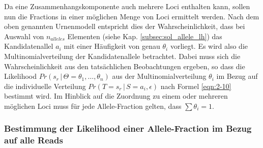 Da eine Zusammenhangskomponente auch mehrere Loci enthalten kann, sollen nun die Fractions in einer möglichen Menge von Loci ermittelt werden. Nach dem oben genannten Urnenmodell entspricht dies der Wahrscheinlichkeit, dass bei Auswahl von $n_{alleles}$ Elementen (siehe Kap. \ref{subsec:sol_allele_lh}) das Kandidatenallel $ a_{i}$ mit einer Häufigkeit von genau $\theta_{i}$ vorliegt. Es wird also die Multinomialverteilung der Kandidatenallele betrachtet. Dabei muss sich die Wahrscheinlichkeit aus den tatsächlichen Beobachtungen ergeben, so dass die Likelihood $Pr(s_{r} \, | \, \Theta=\theta_{1},\dots,\theta_{n})$ aus der Multinomialverteilung $\theta_{i}$ im Bezug auf die individuelle Verteilung $Pr(T=s_{r} \, | \, S=a_{i}, \epsilon)$ nach Formel \eqref{eqn:2-10} bestimmt wird. Im Hinblick auf die Zuordnung zu einem oder mehreren möglichen Loci muss für jede Allele-Fraction gelten, dass $\sum \theta_{i} = 1$.
\vspace{-0.5cm}
\begin{center}
\end{center}
\subsubsection{Bestimmung der Likelihood einer Allele-Fraction im Bezug auf alle Reads} \label{sol_vaf_all_reads}

